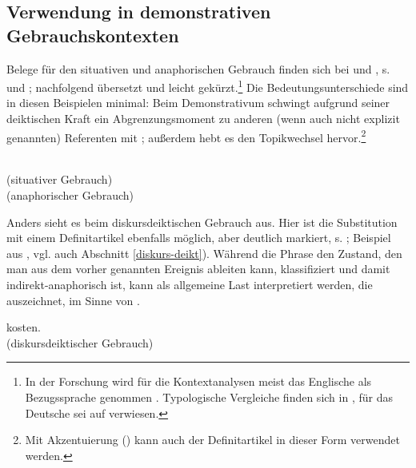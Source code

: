 \subsection{Verwendung in demonstrativen Gebrauchskontexten}\label{sec:definitartikel-in-demonstrativ}

Belege für den situativen und anaphorischen Gebrauch finden sich bei \textcite[110-111]{Hawkins1978} und \textcite[36]{Himmelmann1997}, s.  und ; nachfolgend übersetzt und leicht gekürzt.\footnote{In der Forschung wird für die Kontextanalysen meist das Englische als Bezugssprache genommen \parencite{Christophersen1939, Lobner1985,Lyons1999}. Typologische Vergleiche finden sich in \textcite{Himmelmann1997}, für das Deutsche sei auf \textcite{Bisle-Muller1991} verwiesen.} Die Bedeutungsunterschiede sind in diesen Beispielen minimal: Beim Demonstrativum schwingt aufgrund seiner deiktischen Kraft ein Abgrenzungsmoment zu anderen (wenn auch nicht explizit genannten) Referenten mit \parencite{Bisle-Muller1991}; außerdem hebt es den Topikwechsel hervor.\footnote{Mit Akzentuierung () kann auch der Definitartikel in dieser Form verwendet werden.}   

\begin{exe}
	\ex \label{ex:sitdef}   \\(situativer Gebrauch)
	\ex \label{ex:anadef}  \\(anaphorischer Gebrauch)
\end{exe}

Anders sieht es beim diskursdeiktischen Gebrauch aus. Hier ist die Substitution mit einem Definitartikel ebenfalls möglich, aber deutlich markiert, s. ; Beispiel aus \textcite[95]{Marx2011}, vgl. auch Abschnitt \ref{diskurs-deikt}). Während die Phrase  den Zustand, den man aus dem vorher genannten Ereignis ableiten kann, klassifiziert und damit indirekt-anaphorisch ist, kann  als allgemeine Last interpretiert werden, die  auszeichnet, im Sinne von .

\begin{exe}
	\ex \label{ex:diskurs-deikt-def}   kosten. \\(diskursdeiktischer Gebrauch)
	 \end{exe}

